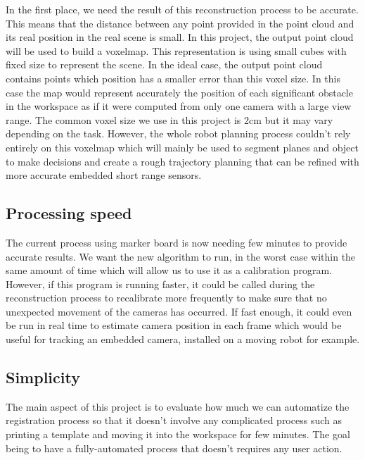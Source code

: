 In the first place, we need the result of this reconstruction process to be accurate. This means that the distance between any point provided in the point cloud and its real position in the real scene is small. In this project, the output point cloud will be used to build a voxelmap. This representation is using small cubes with fixed size to represent the scene. In the ideal case, the output point cloud contains points which position has a smaller error than this voxel size. In this case the map would represent accurately the position of each significant obstacle in the workspace as if it were computed from only one camera with a large view range. The common voxel size we use in this project is 2cm but it may vary depending on the task. However, the whole robot planning process couldn't rely entirely on this voxelmap which will mainly be used to segment planes and object to make decisions and create a rough trajectory planning that can be refined with more accurate embedded short range sensors. \\

\subsection{Processing speed}

The current process using marker board is now needing few minutes to provide accurate results. We want the new algorithm to run, in the worst case within the same amount of time which will allow us to use it as a calibration program. However, if this program is running faster, it could be called during the reconstruction process to recalibrate more frequently to make sure that no unexpected movement of the cameras has occurred. If fast enough, it could even be run in real time to estimate camera position in each frame which would be useful for tracking an embedded camera, installed on a moving robot for example.

\subsection{Simplicity}

The main aspect of this project is to evaluate how much we can automatize the registration process so that it doesn't involve any complicated process such as printing a template and moving it into the workspace for few minutes. The goal being to have a fully-automated process that doesn't requires any user action.

